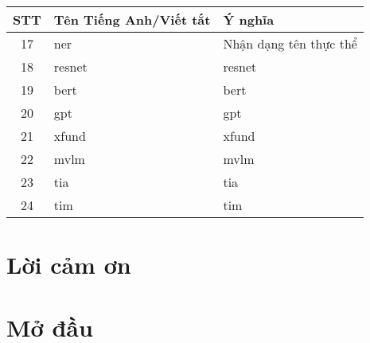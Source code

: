 \documentclass[a4paper]{report}
\begin{document}
\begin{center}
  \begin{tabular}{| c | m{6.5cm} | m{6.0cm} |}
  \hline
  \textbf{STT} & \textbf{Tên Tiếng Anh/Viết tắt} & \textbf{Ý nghĩa} \\ 
  \hline
  17 & \acrfull*{ner} & Nhận dạng tên thực thể \\ 
  \hline
  18 & \acrshort*{resnet} & \acrlong*{resnet} \\ 
  \hline
  19 & \acrshort*{bert} & \acrlong*{bert} \\ 
  \hline
  20 & \acrshort*{gpt} & \acrlong*{gpt} \\ 
  \hline
  21 & \acrshort*{xfund} & \acrlong*{xfund} \\ 
  \hline
  22 & \acrshort*{mvlm} & \acrlong*{mvlm} \\ 
  \hline
  23 & \acrshort*{tia} & \acrlong*{tia} \\ 
  \hline
  24 & \acrshort*{tim} & \acrlong*{tim} \\ 
  \hline
\end{tabular}
\end{center}

\newpage
\section*{\Large\selectfont\centering Lời cảm ơn}

\newpage
\section*{\Large\selectfont\centering Mở đầu}
\newpage

\newpage


\newpage


\newpage

\newpage

\newpage


\newpage
{}
\printbibliography[heading=talikarng]
\end{document}
